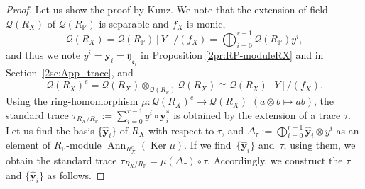 \documentclass[10pt,a4paper]{amsart}
\def\PP{{\mathbb P}}
\def\bby{{\mathbf y}}
\def\cQ{{\mathcal Q}}
\def\fe{{\mathfrak e}}
\def\fy{{\mathfrak y}}
\def\hby{\widehat {{\mathbf y}}}
\def\Ker{\operatorname{Ker}}
\def\Ann{\operatorname{Ann}}
\numberwithin{equation}{section}
\begin{document}
\begin{proof}Let us show the proof by Kunz.
We note that the extension of field $\cQ(R_X)$ of $\cQ(R_\PP)$ is separable and $f_X$ is monic,
\[
\cQ(R_X)=\cQ(R_\PP)[Y]/(f_X) = \bigoplus_{i=0}^{r-1} \cQ(R_\PP)y^i,
\]
and thus we note $y^i =\bby_i = \fy_{\fe_i}$ in Proposition \ref{2pr:RP-moduleRX} and in Section~\ref{2sc:App_trace}, and
\[
\cQ(R_X)^e = \cQ(R_X)\otimes_{\cQ(R_\PP)} \cQ(R_X) \cong \cQ(R_X)[Y]/(f_X).
\]
Using the ring-homomorphism $\mu\colon \cQ(R_X)^e\to \cQ(R_X)$ $(a\otimes b \mapsto ab)$, the standard trace $\tau_{R_X/R_\PP}:=\sum_{i=0}^{r-1} y^i \circ \bby_i^*$ is obtained by the extension of a trace $\tau$.
Let us find the basis $\{\hby_i\}$ of $R_X$ with respect to $\tau$, and $\Delta_\tau:=\bigoplus_{i=0}^{r-1} \hby_i\otimes y^i$ as an element of $R_\PP$-module $\Ann_{R_X^e}(\Ker \mu)$. If we find~$\{\hby_i\}$ and~$\tau$, using them, we obtain the standard trace $\tau_{R_X/R_\PP}=\mu(\Delta_\tau)\circ \tau$.
Accordingly, we construct the $\tau$ and $\{\hby_i\}$ as follows.


\end{proof}
\end{document}
